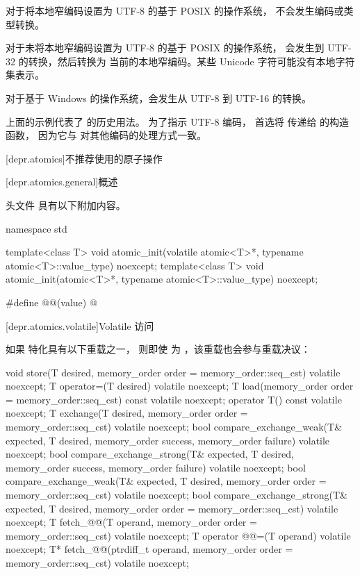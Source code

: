\begin{itemdescr}
\begin{example}
对于将本地窄编码设置为 UTF-8 的基于 POSIX 的操作系统，
    不会发生编码或类型转换。

对于未将本地窄编码设置为 UTF-8 的基于 POSIX 的操作系统，
    会发生到 UTF-32 的转换，然后转换为
    当前的本地窄编码。某些 Unicode 字符可能没有本地字符
    集表示。

对于基于 Windows 的操作系统，会发生从 UTF-8 到
    UTF-16 的转换。
\end{example}
\begin{note}
上面的示例代表了
     的历史用法。
为了指示 UTF-8 编码，
    首选将  传递给  的构造函数，
因为它与  对其他编码的处理方式一致。
\end{note}
\end{itemdescr}

[depr.atomics]{不推荐使用的原子操作}

[depr.atomics.general]{概述}

\pnum
头文件  具有以下附加内容。

\begin{codeblock}
namespace std {
  template<class T>
    void atomic_init(volatile atomic<T>*, typename atomic<T>::value_type) noexcept;
  template<class T>
    void atomic_init(atomic<T>*, typename atomic<T>::value_type) noexcept;

  #define @@(value) @\seebelow@
}
\end{codeblock}

[depr.atomics.volatile]{Volatile 访问}

\pnum
如果  特化具有以下重载之一，
则即使  为 ，该重载也会参与重载决议：
\begin{codeblock}
void store(T desired, memory_order order = memory_order::seq_cst) volatile noexcept;
T operator=(T desired) volatile noexcept;
T load(memory_order order = memory_order::seq_cst) const volatile noexcept;
operator T() const volatile noexcept;
T exchange(T desired, memory_order order = memory_order::seq_cst) volatile noexcept;
bool compare_exchange_weak(T& expected, T desired,
                           memory_order success, memory_order failure) volatile noexcept;
bool compare_exchange_strong(T& expected, T desired,
                             memory_order success, memory_order failure) volatile noexcept;
bool compare_exchange_weak(T& expected, T desired,
                           memory_order order = memory_order::seq_cst) volatile noexcept;
bool compare_exchange_strong(T& expected, T desired,
                             memory_order order = memory_order::seq_cst) volatile noexcept;
T fetch_@@(T operand, memory_order order = memory_order::seq_cst) volatile noexcept;
T operator @@=(T operand) volatile noexcept;
T* fetch_@@(ptrdiff_t operand, memory_order order = memory_order::seq_cst) volatile noexcept;
\end{codeblock}

